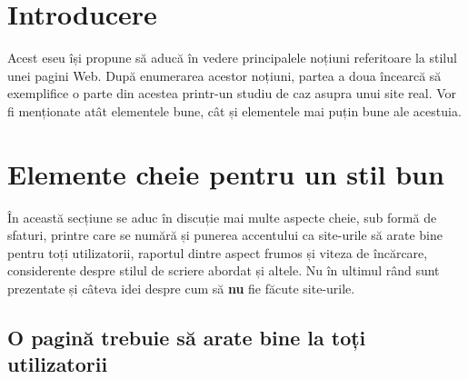 \documentclass[12pt]{article} %
\begin{document}

\tableofcontents %

\newpage %


\section{Introducere} %

Acest eseu își propune să aducă în vedere principalele noțiuni referitoare la stilul unei
pagini Web. După enumerarea acestor noțiuni, partea a doua încearcă să exemplifice o
parte din acestea printr-un studiu de caz asupra unui site real. Vor fi menționate atât
elementele bune, cât și elementele mai puțin bune ale acestuia.


\section{Elemente cheie pentru un stil bun}

În această secțiune se aduc în discuție mai multe aspecte cheie, sub formă de sfaturi,
printre care se numără și punerea accentului ca site-urile să arate bine pentru toți
utilizatorii, raportul dintre aspect frumos și viteza de încărcare, considerente despre
stilul de scriere abordat și altele. Nu în ultimul rând sunt prezentate și câteva idei
despre cum să \textbf{nu} fie făcute site-urile.


\subsection{O pagină trebuie să arate bine la toți utilizatorii} %
\end{document}
